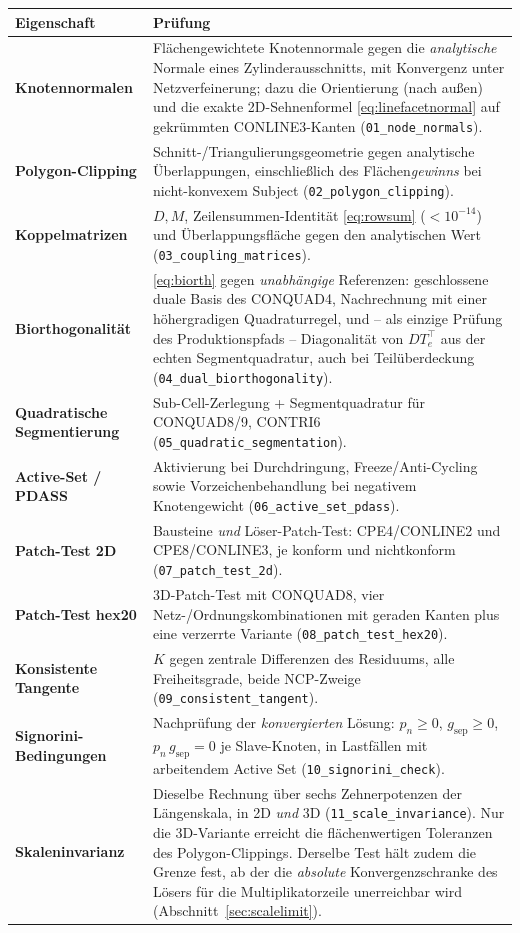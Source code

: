 \documentclass[a4paper,11pt]{article}
\def\bm#1{#1}%
\newcommand{\file}[1]{\texttt{\small #1}}
\begin{document}
\begin{center}
\small
\begin{tabularx}{\linewidth}{lX}
\toprule
Eigenschaft & Prüfung \\
\midrule
\textbf{Knotennormalen} & Flächengewichtete Knotennormale gegen die \emph{analytische} Normale eines Zylinderausschnitts, mit Konvergenz unter Netzverfeinerung; dazu die Orientierung (nach außen) und die exakte 2D-Sehnenformel \eqref{eq:linefacetnormal} auf gekrümmten CONLINE3-Kanten (\file{01\_node\_normals}). \\
\textbf{Polygon-Clipping} & Schnitt-/Triangulierungsgeometrie gegen analytische Überlappungen, einschließlich des Flächen\emph{gewinns} bei nicht-konvexem Subject (\file{02\_polygon\_clipping}). \\
\textbf{Koppelmatrizen} & $\bm D,\bm M$, Zeilensummen-Identität \eqref{eq:rowsum} ($<10^{-14}$) und Überlappungsfläche gegen den analytischen Wert (\file{03\_coupling\_matrices}). \\
\textbf{Biorthogonalität} & \eqref{eq:biorth} gegen \emph{unabhängige} Referenzen: geschlossene duale Basis des CONQUAD4, Nachrechnung mit einer höhergradigen Quadraturregel, und -- als einzige Prüfung des Produktionspfads -- Diagonalität von $\bm D\bm T_e^{\!\top}$ aus der echten Segmentquadratur, auch bei Teilüberdeckung (\file{04\_dual\_biorthogonality}). \\
\textbf{Quadratische Segmentierung} & Sub-Cell-Zerlegung + Segmentquadratur für CONQUAD8/9, CONTRI6 (\file{05\_quadratic\_segmentation}). \\
\textbf{Active-Set / PDASS} & Aktivierung bei Durchdringung, Freeze/Anti-Cycling sowie Vorzeichenbehandlung bei negativem Knotengewicht (\file{06\_active\_set\_pdass}). \\
\textbf{Patch-Test 2D} & Bausteine \emph{und} Löser-Patch-Test: CPE4/CONLINE2 und CPE8/CONLINE3, je konform und nichtkonform (\file{07\_patch\_test\_2d}). \\
\textbf{Patch-Test hex20} & 3D-Patch-Test mit CONQUAD8, vier Netz-/Ordnungskombinationen mit geraden Kanten plus eine verzerrte Variante (\file{08\_patch\_test\_hex20}). \\
\textbf{Konsistente Tangente} & $\bm K$ gegen zentrale Differenzen des Residuums, alle Freiheitsgrade, beide NCP-Zweige (\file{09\_consistent\_tangent}). \\
\textbf{Signorini-Bedingungen} & Nachprüfung der \emph{konvergierten} Lösung: $p_n\ge0$, $g_{\text{sep}}\ge0$, $p_n\,g_{\text{sep}}=0$ je Slave-Knoten, in Lastfällen mit arbeitendem Active Set (\file{10\_signorini\_check}). \\
\textbf{Skaleninvarianz} & Dieselbe Rechnung über sechs Zehnerpotenzen der Längenskala, in 2D \emph{und} 3D (\file{11\_scale\_invariance}). Nur die 3D-Variante erreicht die flächenwertigen Toleranzen des Polygon-Clippings. Derselbe Test hält zudem die Grenze fest, ab der die \emph{absolute} Konvergenzschranke des Lösers für die Multiplikatorzeile unerreichbar wird (Abschnitt~\ref{sec:scalelimit}). \\
\bottomrule
\end{tabularx}
\end{center}
\end{document}
